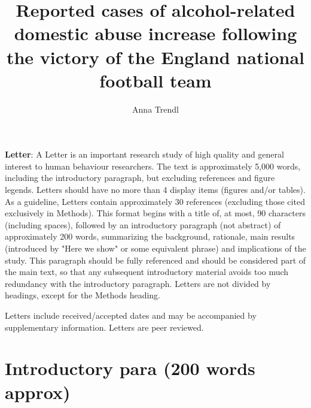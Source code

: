 \documentclass[12pt, letterpaper]{article}
\begin{document}
\title{Reported cases of alcohol-related domestic abuse increase following the victory of the England national football team}


\author{Anna Trendl}
\textbf{Letter}:
A Letter is an important research study of high quality and general interest to human behaviour researchers.  The text is approximately 5,000 words, including the introductory paragraph, but excluding references and figure legends. Letters should have no more than 4 display items (figures and/or tables). As a guideline, Letters contain approximately 30 references (excluding those cited exclusively in Methods). This format begins with a title of, at most, 90 characters (including spaces), followed by an introductory paragraph (not abstract) of approximately 200 words, summarizing the background, rationale, main results (introduced by "Here we show" or some equivalent phrase) and implications of the study. This paragraph should be fully referenced and should be considered part of the main text, so that any subsequent introductory material avoids too much redundancy with the introductory paragraph. Letters are not divided by headings, except for the Methods heading.

Letters include received/accepted dates and may be accompanied by supplementary information. Letters are peer reviewed.


\maketitle

\section{Introductory para (200 words approx)}
\end{document}
